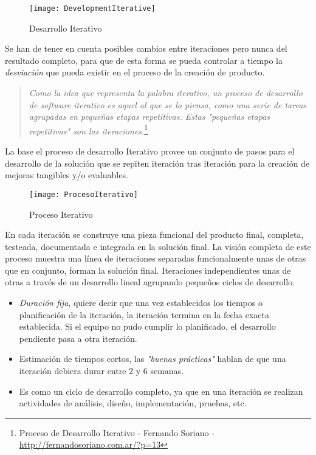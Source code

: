 \begin{figure}[H]
    \centering
    \texttt{[image: DevelopmentIterative]}
    \caption{Desarrollo Iterativo}
    \label{fig:desarrollo-iterativo}
\end{figure}

\par Se han de tener en cuenta posibles cambios entre iteraciones pero nunca del resultado completo, para que de esta forma se pueda controlar a tiempo la \emph{desviación} que pueda existir en el proceso de la creación de producto.

\begin{quote}
    \emph{Como la idea que representa la palabra iterativo, un proceso de desarrollo de software iterativo es aquel al que se lo piensa, como una serie de tareas agrupadas en pequeñas etapas repetitivas. Estas "pequeñas etapas repetitivas" son las iteraciones.}\footnote{Proceso de Desarrollo Iterativo - Fernando Soriano - \url{http://fernandosoriano.com.ar/?p=13}}
\end{quote}

\par La base el proceso de desarrollo Iterativo provee un conjunto de pasos para el desarrollo de la solución que se repiten iteración tras iteración para la creación de mejoras tangibles y/o evaluables. 

\begin{figure}[H]
    \centering
    \texttt{[image: ProcesoIterativo]}
    \caption{Proceso Iterativo}
    \label{fig:ProcesoIterativo}
\end{figure}

\par En cada iteración se construye una pieza funcional del producto final, completa, testeada, documentada e integrada en la solución final. La visión completa de este proceso muestra una línea de iteraciones separadas funcionalmente unas de otras que en conjunto, forman la solución final. Iteraciones independientes unas de otras a través de un desarrollo lineal agrupando pequeños ciclos de desarrollo.

\begin{itemize}
	\item \emph{Duración fija}, quiere decir que una vez establecidos los tiempos o planificación de la iteración, la iteración termina en la fecha exacta establecida. Si el equipo no pudo cumplir lo planificado, el desarrollo pendiente pasa a otra iteración.
	\item Estimación de tiempos cortos, las \emph{"buenas prácticas"} hablan de que una iteración debiera durar entre 2 y 6 semanas.
	\item Es como un ciclo de desarrollo completo, ya que en una iteración se realizan actividades de análisis, diseño, implementación, pruebas, etc.
\end{itemize}

